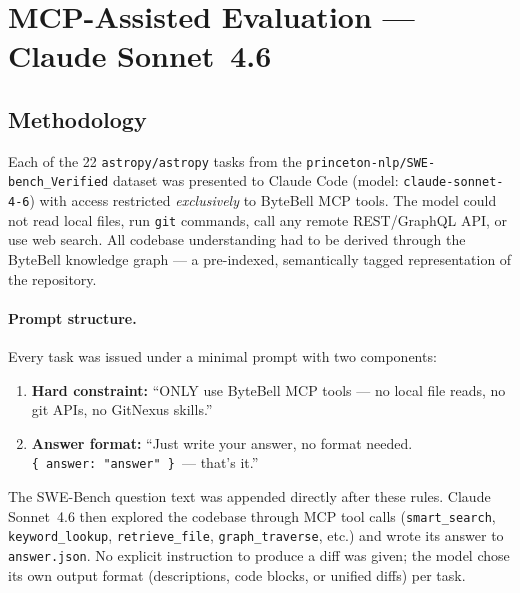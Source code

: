 
\section{MCP-Assisted Evaluation --- Claude Sonnet~4.6}\label{sec:mcp-sonnet}

\subsection{Methodology}

Each of the 22 \texttt{astropy/astropy} tasks from the
\texttt{princeton-nlp/SWE-bench\_Verified} dataset was presented to
Claude Code (model: \texttt{claude-sonnet-4-6}) with access restricted
\emph{exclusively} to ByteBell MCP tools.
The model could not read local files, run \texttt{git} commands, call
any remote REST/GraphQL API, or use web search.
All codebase understanding had to be derived through the ByteBell
knowledge graph --- a pre-indexed, semantically tagged representation of
the repository.

\paragraph{Prompt structure.}
Every task was issued under a minimal prompt with two components:

\begin{enumerate}
  \item \textbf{Hard constraint:} ``ONLY use ByteBell MCP tools --- no
        local file reads, no git APIs, no GitNexus skills.''
  \item \textbf{Answer format:} ``Just write your answer, no format
        needed.  \texttt{\{\ answer:\ "answer"\ \}}\ --- that's it.''
\end{enumerate}

\noindent
The SWE-Bench question text was appended directly after these rules.
Claude Sonnet~4.6 then explored the codebase through MCP tool calls
(\texttt{smart\_search}, \texttt{keyword\_lookup},
\texttt{retrieve\_file}, \texttt{graph\_traverse}, etc.) and wrote
its answer to \texttt{answer.json}.
No explicit instruction to produce a diff was given; the model chose
its own output format (descriptions, code blocks, or unified diffs)
per task.

